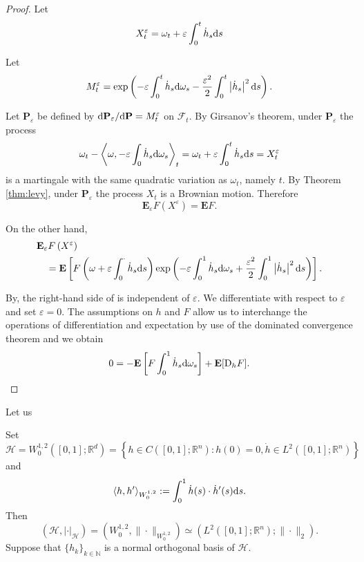 \documentclass[twoside, 12pt]{book}
\numberwithin{equation}{chapter}
\def\cH{{\mathcal H}}
\def\mN{{\mathbb N}}
\def\mR{{\mathbb R}}
\def\l{\left}
\def\r{\right}
\def\<{\langle}
\def\>{\rangle}
\def\d{\text{\rm{d}}}
\begin{document}
    \begin{proof}
    Let
    $$
      X_t^{\varepsilon}=\omega_t+\varepsilon \int_0^t \dot h_s \d s
    $$

     Let
    $$
         M_t^{\varepsilon}=\exp \left(-\varepsilon \int_0^t \dot h_s \d \omega_s-\frac{\varepsilon^2}{2} \int_0^t\left|\dot h_s\right|^2 \d s\right) .
    $$

     Let $\mathbf{P}_{\varepsilon}$ be defined by $\d \mathbf{P}_{\varepsilon} / \d \mathbf{P}=M_t^{\varepsilon}$ on $\mathcal{F}_t$. By Girsanov's theorem, under $\mathbf{P}_{\varepsilon}$ the process
    $$
        \omega_t-\left\langle \omega,-\varepsilon \int_0 \dot h_s \d \omega_s\right\rangle_t=\omega_t+\varepsilon \int_0^t \dot h_s \d s=X_t^{\varepsilon}
    $$
    is a martingale with the same quadratic variation as $\omega_t$, namely $t$. By Theorem \ref{thm:levy}, under $\mathbf{P}_{\varepsilon}$ the process $X_t$ is a Brownian motion. Therefore
    $$
        \mathbf{E}_{\varepsilon} F\left(X^{\varepsilon}\right)=\mathbf{E} F.
    $$

    On the other hand,
    $$
    \begin{aligned}
    & \mathbf{E}_{\varepsilon} F\left(X^{\varepsilon}\right) \\
    & \quad=\mathbf{E}\left[F\left(\omega+\varepsilon \int_0^\cdot \dot h_s \d s\right) \exp \left(-\varepsilon \int_0^1 \dot h_s \d \omega_s+\frac{\varepsilon^2}{2} \int_0^1\left|\dot h_s\right|^2 \d s\right)\right] .
    \end{aligned}
    $$

    By, the right-hand side of  is independent of $\varepsilon$. We differentiate with respect to $\varepsilon$ and set $\varepsilon=0$. The assumptions on $h$ and $F$ allow us to interchange the operations of differentiation and expectation by use of the dominated convergence theorem and we obtain
    \[
    0=-\mathbf{E}\left[F \int_0^1 \dot h_s \d \omega_s\right]+\mathbf{E} [ \mathrm{D}_h F].
    \]
    \end{proof}
    	
    Let us 
    
    Set 
    \[
    \cH=W^{1,2}_0([0,1];\mR^d)=\l\{h\in C([0,1];\mR^n): h(0)=0, \dot h\in L^2([0,1];\mR^n)\r\}
    \]
    and 
    \[
    \<h, h'\>_{W^{1,2}_0}:= \int_0^1 \dot h(s)\cdot \dot h'(s) \d s. 
    \]
    Then 
    \[
    ( \cH, |\cdot|_{ \cH})=(W^{1,2}_0, \|\cdot\|_{W^{1,2}_0})\simeq (L^2([0,1];\mR^n); \|\cdot\|_2). 
    \]
    Suppose that $\{h_k\}_{k\in \mN}$ is a normal orthogonal basis of $\cH$. 
    
\end{document}
